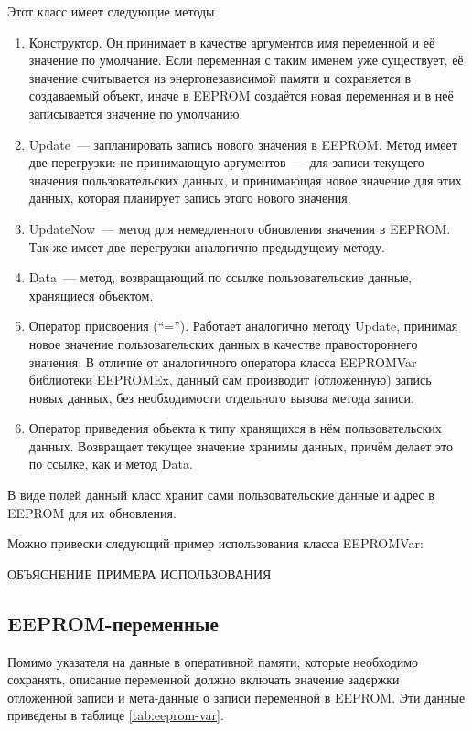 Этот класс имеет следующие методы
\begin{enumerate}
	\item Конструктор. Он принимает в качестве аргументов имя переменной и её значение по умолчание.
	Если переменная с таким именем уже существует, её значение считывается из энергонезависимой памяти и сохраняется в создаваемый объект, иначе в EEPROM создаётся новая переменная и в неё записывается значение по умолчанию.
	\item Update~--- запланировать запись нового значения в EEPROM.
	Метод имеет две перегрузки: не принимающую аргументов~--- для записи текущего значения пользовательских данных, и принимающая новое значение для этих данных, которая планирует запись этого нового значения.
	\item UpdateNow~--- метод для немедленного обновления значения в EEPROM.
	Так же имеет две перегрузки аналогично предыдущему методу.
	\item Data~--- метод, возвращающий по ссылке пользовательские данные, хранящиеся объектом.
	\item Оператор присвоения ("`="').
	Работает аналогично методу Update, принимая новое значение пользовательских данных в качестве правостороннего значения.
	В отличие от аналогичного оператора класса EEPROMVar библиотеки EEPROMEx, данный сам производит (отложенную) запись новых данных, без необходимости отдельного вызова метода записи.
	\item Оператор приведения объекта к типу хранящихся в нём пользовательских данных.
	Возвращает текущее значение хранимы данных, причём делает это по ссылке, как и метод Data.
\end{enumerate}

В виде полей данный класс хранит сами пользовательские данные и адрес в EEPROM для их обновления.

Можно привески следующий пример использования класса EEPROMVar:



ОБЪЯСНЕНИЕ ПРИМЕРА ИСПОЛЬЗОВАНИЯ


\iffalse
\subsection{EEPROM-переменные}

Помимо указателя на данные в оперативной памяти, которые необходимо сохранять, описание переменной должно включать значение задержки отложенной записи и мета-данные о записи переменной в EEPROM.
Эти данные приведены в таблице \ref{tab:eeprom-var}.

